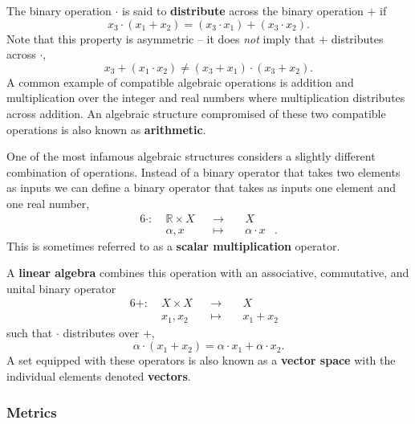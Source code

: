 \documentclass[
  letterpaper,
  DIV=11,
  numbers=noendperiod]{scrartcl}
\begin{document}
The binary operation \(\cdot\) is said to \textbf{distribute} across the
binary operation \(+\) if \[
x_3 \cdot (x_1 + x_2) = (x_3 \cdot x_1) + (x_3 \cdot x_2).
\] Note that this property is asymmetric -- it does \emph{not} imply
that \(+\) distributes across \(\cdot\), \[
x_3 + (x_1 \cdot x_2) \ne (x_3 + x_1) \cdot (x_3 + x_2).
\] A common example of compatible algebraic operations is addition and
multiplication over the integer and real numbers where multiplication
distributes across addition. An algebraic structure compromised of these
two compatible operations is also known as \textbf{arithmetic}.

One of the most infamous algebraic structures considers a slightly
different combination of operations. Instead of a binary operator that
takes two elements as inputs we can define a binary operator that takes
as inputs one element and one real number, \begin{alignat*}{6}
\cdot :\; & \mathbb{R} \times X& &\rightarrow& \; & X &
\\
& \alpha, x & &\mapsto& & \alpha \cdot x &.
\end{alignat*} This is sometimes referred to as a \textbf{scalar
multiplication} operator.

A \textbf{linear algebra} combines this operation with an associative,
commutative, and unital binary operator \begin{alignat*}{6}
+ :\; & X \times X& &\rightarrow& \; & X &
\\
& x_{1}, x_{2} & &\mapsto& & x_{1} + x_{2} &
\end{alignat*} such that \(\cdot\) distributes over \(+\), \[
\alpha \cdot (x_{1} + x_{2}) = \alpha \cdot x_{1} + \alpha \cdot x_{2}.
\] A set equipped with these operators is also known as a \textbf{vector
space} with the individual elements denoted \textbf{vectors}.

\hypertarget{metrics}{%
\subsubsection{Metrics}\label{metrics}}
\end{document}
